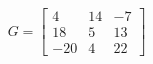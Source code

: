 \documentclass[preview]{standalone}
\begin{document}
\begin{align*}
G = \begin{bmatrix}
                        4 & 14 & -7\\
                        18 & 5 & 13\\
                        -20 & 4 & 22
                    \end{bmatrix}
\end{align*}
\end{document}
